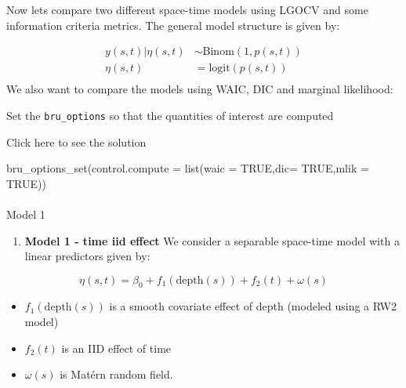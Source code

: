 \documentclass[
  letterpaper,
  DIV=11,
  numbers=noendperiod]{scrartcl}
\makeatletter
\let\oldparagraph\paragraph
\renewcommand{\paragraph}{
    \@ifstar
      \xxxParagraphStar
      \xxxParagraphNoStar
  }
\newcommand{\xxxParagraphStar}[1]{\oldparagraph*{#1}\mbox{}}
\newcommand{\xxxParagraphNoStar}[1]{\oldparagraph{#1}\mbox{}}
\newenvironment{Shaded}{\begin{snugshade}}{\end{snugshade}}
\newcommand{\AttributeTok}[1]{\textcolor[rgb]{0.40,0.45,0.13}{#1}}
\newcommand{\ConstantTok}[1]{\textcolor[rgb]{0.56,0.35,0.01}{#1}}
\newcommand{\FunctionTok}[1]{\textcolor[rgb]{0.28,0.35,0.67}{#1}}
\newcommand{\NormalTok}[1]{\textcolor[rgb]{0.00,0.23,0.31}{#1}}
\providecommand{\tightlist}{%
  \setlength{\itemsep}{0pt}\setlength{\parskip}{0pt}}
\makeatother
\begin{document}
Now lets compare two different space-time models using LGOCV and some
information criteria metrics. The general model structure is given by:

\[
\begin{aligned}
y(s,t)|\eta(s,t)&\sim\text{Binom}(1, p(s,t))\\
\eta(s,t) &= \text{logit}(p(s,t)) \\
\end{aligned}
\] We also want to compare the models using WAIC, DIC and marginal
likelihood:

\begin{tcolorbox}[enhanced jigsaw, arc=.35mm, bottomrule=.15mm, bottomtitle=1mm, breakable, colback=white, colbacktitle=quarto-callout-warning-color!10!white, colframe=quarto-callout-warning-color-frame, coltitle=black, left=2mm, leftrule=.75mm, opacityback=0, opacitybacktitle=0.6, rightrule=.15mm, title={Task}, titlerule=0mm, toprule=.15mm, toptitle=1mm]

Set the \texttt{bru\_options} so that the quantities of interest are
computed

Click here to see the solution

\begin{Shaded}
\begin{Highlighting}[]
\FunctionTok{bru\_options\_set}\NormalTok{(}\AttributeTok{control.compute =} \FunctionTok{list}\NormalTok{(}\AttributeTok{waic =} \ConstantTok{TRUE}\NormalTok{,}\AttributeTok{dic=} \ConstantTok{TRUE}\NormalTok{,}\AttributeTok{mlik =} \ConstantTok{TRUE}\NormalTok{))}
\end{Highlighting}
\end{Shaded}

\end{tcolorbox}

\paragraph{Model 1}\label{model-1}

\begin{enumerate}
\def\labelenumi{\arabic{enumi}.}
\tightlist
\item
  \textbf{Model 1 - time iid effect} We consider a separable space-time
  model with a linear predictors given by:
\end{enumerate}

\[
\eta(s,t) = \beta_0 + f_1(\text{depth}(s)) + f_2(t) + \omega(s)
\]

\begin{itemize}
\item
  \(f_1(\text{depth}(s))\) is a smooth covariate effect of depth
  (modeled using a RW2 model)
\item
  \(f_2(t)\) is an IID effect of time
\item
  \(\omega(s)\) is Matérn random field.
\end{itemize}
\end{document}
